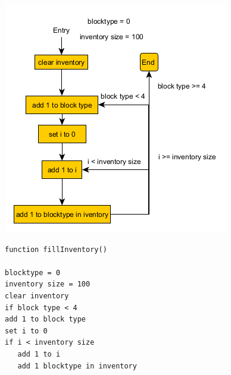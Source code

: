 {\includegraphics[width=\textwidth]{../flowchart/fillInventory.png}}
\begin{lstlisting}
function fillInventory()

blocktype = 0
inventory size = 100
clear inventory
if block type < 4
add 1 to block type
set i to 0
if i < inventory size
   add 1 to i
   add 1 blocktype in inventory

\end{lstlisting}
\newpage
